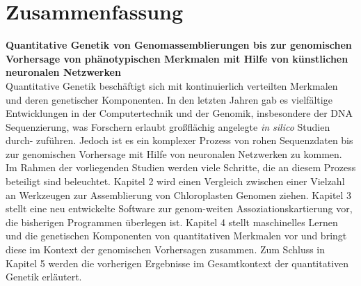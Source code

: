 \chapter{Zusammenfassung} %
\textbf{Quantitative Genetik von Genomassemblierungen bis zur genomischen Vorhersage von ph\"{a}notypischen Merkmalen mit Hilfe von künstlichen neuronalen Netzwerken} \\
Quantitative Genetik beschäftigt sich mit kontinuierlich verteilten Merkmalen und deren
genetischer Komponenten. In den letzten Jahren gab es vielfältige Entwicklungen in der
Computertechnik und der Genomik, insbesondere der DNA Sequenzierung, was Forschern erlaubt
großflächig angelegte \textit{in silico} Studien durch- zuführen. Jedoch ist es ein
komplexer Prozess von rohen Sequenzdaten bis zur genomischen Vorhersage mit Hilfe von
neuronalen Netzwerken zu kommen. Im Rahmen der vorliegenden Studien werden viele Schritte,
die an diesem Prozess beteiligt sind beleuchtet. Kapitel 2 wird einen Vergleich zwischen
einer Vielzahl an Werkzeugen zur Assemblierung von Chloroplasten Genomen ziehen. Kapitel 3
stellt eine neu entwickelte Software zur genom-weiten Assoziationskartierung vor, die
bisherigen Programmen überlegen ist. Kapitel 4 stellt maschinelles Lernen und die
genetischen Komponenten von quantitativen Merkmalen vor und bringt diese im Kontext der
genomischen Vorhersagen zusammen. Zum Schluss in Kapitel 5 werden die vorherigen
Ergebnisse im Gesamtkontext der quantitativen Genetik erläutert.



     





